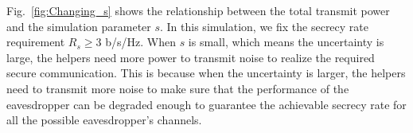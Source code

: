 \documentclass[journal]{IEEEtran}
\begin{document}
Fig.~\ref{fig:Changing_s} shows  the relationship between the total transmit power and the simulation parameter $s$. In this simulation, we fix the secrecy rate requirement $R_s \geq 3 $ b/s/Hz. When $s$ is small, which means the uncertainty is large, the helpers need more power to transmit noise to realize the required secure communication. This is because when the uncertainty is larger, the helpers need to transmit more noise to make sure that the performance of the eavesdropper can be degraded enough to guarantee the achievable secrecy rate for all the possible eavesdropper's channels.

%

%
%
\end{document}
